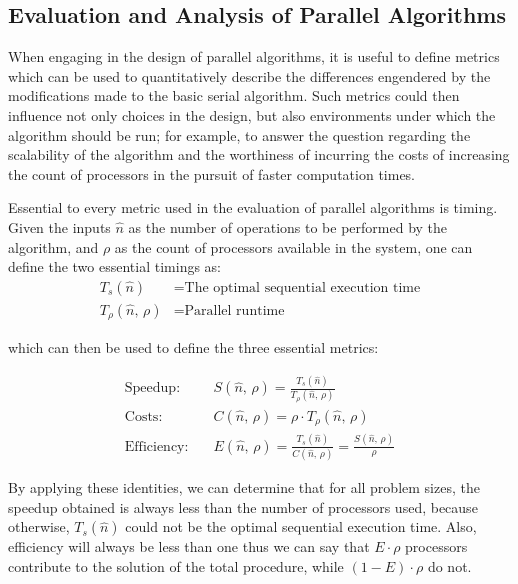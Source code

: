 %
%
%
%
\subsection{Evaluation and Analysis of Parallel Algorithms}
When engaging in the design of parallel algorithms, it is useful to define metrics which can be used to quantitatively describe the differences engendered by the modifications made to the basic serial algorithm. Such metrics could then influence not only choices in the design, but also environments under which the algorithm should be run; for example, to answer the question regarding the scalability of the algorithm and the worthiness of incurring the costs of increasing the count of processors in the pursuit of faster computation times.~\cite[p.~330]{Lang17}

Essential to every metric used in the evaluation of parallel algorithms is timing. Given the inputs $\hat{n}$ as the number of operations to be performed by the algorithm, and $\rho$ as the count of processors available in the system, one can define the two essential timings as:
%
\begin{align}
	\mathit{T_s}(\hat{n}) &= \text{The optimal sequential execution time} \\
	\mathit{T_{\rho}}(\hat{n},\,\rho) &= \text{Parallel runtime}
	\label{eq:timings}
\end{align}

which can then be used to define the three essential metrics:

\begin{align}
	\text{Speedup:}\quad&\mathit{S}(\hat{n},\,\rho) = \frac{\mathit{T_s}(\hat{n})}{\mathit{T_{\rho}}(\hat{n},\,\rho)} \\
	\text{Costs}:\quad&\mathit{C}(\hat{n},\,\rho) =\rho\cdot\mathit{T_{\rho}}(\hat{n},\,\rho) \\
	\text{Efficiency}:\quad&\mathit{E}(\hat{n},\,\rho) = \frac{\mathit{T_s}(\hat{n})}{\mathit{C}(\hat{n},\,\rho)} = \frac{\mathit{S}(\hat{n},\,\rho)}{\rho}
	\label{eq:essentialMetrics}
\end{align}

By applying these identities, we can determine that for all problem sizes, the speedup obtained is always less than the number of processors used, because otherwise, $\mathit{T_s}(\hat{n})$ could not be the optimal sequential execution time. Also, efficiency will always be less than one thus we can say that $\mathit{E}\cdot\rho$ processors contribute to the solution of the total procedure, while $(1-\mathit{E})\cdot\rho$ do not.~\cite[p.~335]{Lang17}

